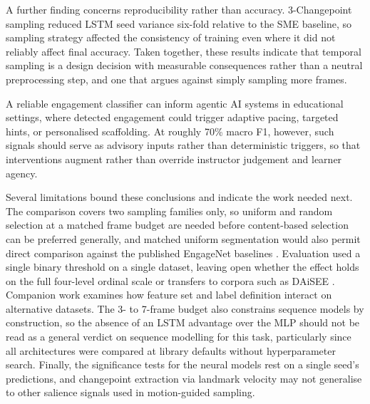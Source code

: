 \documentclass[11pt,a4paper]{article}
\begin{document}
A further finding concerns reproducibility rather than accuracy. 3-Changepoint sampling reduced LSTM seed variance six-fold relative to the SME baseline, so sampling strategy affected the consistency of training even where it did not reliably affect final accuracy. Taken together, these results indicate that temporal sampling is a design decision with measurable consequences rather than a neutral preprocessing step, and one that argues against simply sampling more frames.

A reliable engagement classifier can inform agentic AI systems in educational settings, where detected engagement could trigger adaptive pacing, targeted hints, or personalised scaffolding. At roughly 70\% macro F1, however, such signals should serve as advisory inputs rather than deterministic triggers, so that interventions augment rather than override instructor judgement and learner agency.

Several limitations bound these conclusions and indicate the work needed next. The comparison covers two sampling families only, so uniform and random selection at a matched frame budget are needed before content-based selection can be preferred generally, and matched uniform segmentation would also permit direct comparison against the published EngageNet baselines \citep{singh2023}. Evaluation used a single binary threshold on a single dataset, leaving open whether the effect holds on the full four-level ordinal scale or transfers to corpora such as DAiSEE \citep{gupta2016}. Companion work examines how feature set and label definition interact on alternative datasets. The 3- to 7-frame budget also constrains sequence models by construction, so the absence of an LSTM advantage over the MLP should not be read as a general verdict on sequence modelling for this task, particularly since all architectures were compared at library defaults without hyperparameter search. Finally, the significance tests for the neural models rest on a single seed's predictions, and changepoint extraction via landmark velocity may not generalise to other salience signals used in motion-guided sampling.

\begingroup
\fontsize{10}{12}\selectfont

\endgroup
\end{document}
